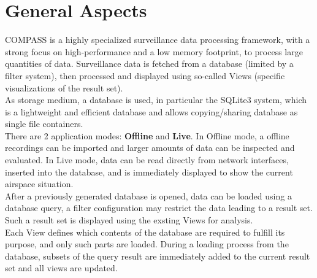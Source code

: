 \section{General Aspects}
COMPASS is a highly specialized surveillance data processing framework, with a strong focus on high-performance and a low memory footprint,  to process large quantities of data. Surveillance data is fetched from a database (limited by a filter system), then processed and displayed using so-called Views (specific visualizations of the result set).\\

As storage medium, a database is used, in particular the SQLite3 system, which is a lightweight and efficient database and allows copying/sharing database as single file containers. \\

There are 2 application modes: \textbf{Offline} and \textbf{Live}. In Offline mode, a offline recordings can be imported and larger amounts of data can be inspected and evaluated. In Live mode, data can be read directly from network interfaces, inserted into the database, and is immediately displayed to show the current airspace situation. \\

After a previously generated database is opened, data can be loaded using a database query, a filter configuration may restrict the data leading to a result set.  Such a result set is displayed using the exsting Views for analysis.\\

Each View defines which contents of the database are required to fulfill its purpose, and only such parts are loaded.  During a loading process from the database, subsets of the query result are immediately added to the current result set and all views are updated.  
